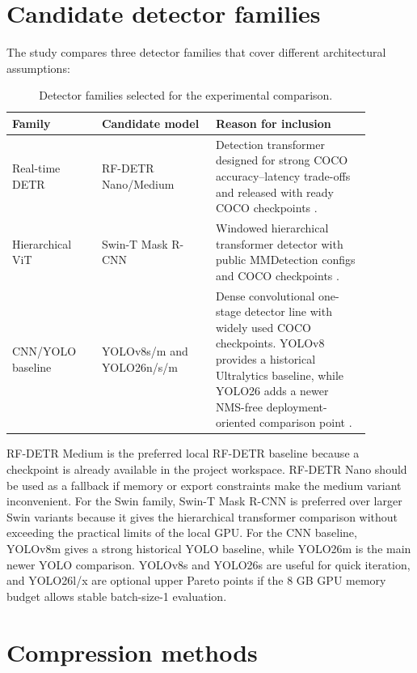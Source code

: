 \documentclass[a4paper,11pt,twoside]{report}
\theoremstyle{definition}
\begin{document}
\section{Candidate detector families}

The study compares three detector families that cover different architectural assumptions:

\begin{table}[H]
\centering
\small
\begin{tabular}{p{0.22\linewidth} p{0.28\linewidth} p{0.38\linewidth}}
\hline
Family & Candidate model & Reason for inclusion \\
\hline
Real-time DETR & RF-DETR Nano/Medium & Detection transformer designed for strong COCO accuracy--latency trade-offs and released with ready COCO checkpoints \cite{Robinson2025RFDETR}. \\
Hierarchical ViT & Swin-T Mask R-CNN & Windowed hierarchical transformer detector with public MMDetection configs and COCO checkpoints \cite{Liu2021Swin}. \\
CNN/YOLO baseline & YOLOv8s/m and YOLO26n/s/m & Dense convolutional one-stage detector line with widely used COCO checkpoints. YOLOv8 provides a historical Ultralytics baseline, while YOLO26 adds a newer NMS-free deployment-oriented comparison point \cite{UltralyticsYOLOv8, UltralyticsYOLO26}. \\
\hline
\end{tabular}
\caption{Detector families selected for the experimental comparison.}
\label{tab:detector_families}
\end{table}

RF-DETR Medium is the preferred local RF-DETR baseline because a checkpoint is already available in the project workspace. RF-DETR Nano should be used as a fallback if memory or export constraints make the medium variant inconvenient. For the Swin family, Swin-T Mask R-CNN is preferred over larger Swin variants because it gives the hierarchical transformer comparison without exceeding the practical limits of the local GPU. For the CNN baseline, YOLOv8m gives a strong historical YOLO baseline, while YOLO26m is the main newer YOLO comparison. YOLOv8s and YOLO26s are useful for quick iteration, and YOLO26l/x are optional upper Pareto points if the 8 GB GPU memory budget allows stable batch-size-1 evaluation.

\section{Compression methods}
\end{document}
